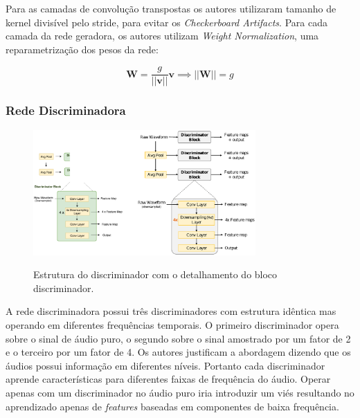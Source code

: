 \documentclass{article}
\begin{document}
Para as camadas de convolução transpostas os autores utilizaram tamanho de kernel divisível pelo stride, para evitar os \textit{Checkerboard Artifacts}\cite{checkerboard-artifacts}. Para cada camada da rede geradora, os autores utilizam \textit{Weight Normalization}\cite{weightnorm}, uma reparametrização dos pesos da rede:

\begin{equation}
\textbf{W} = \frac{g}{||\textbf{v}||}\textbf{v} \implies ||\textbf{W}|| = g
\end{equation}

\subsubsection{Rede Discriminadora}

\begin{figure}[H]
	\begin{minipage}[b]{1.0\linewidth}
		\centering
		\hspace*{-4.3cm}
		{\includegraphics[width=8.5cm]{Figures/dis.eps}}
	\end{minipage}
	\caption{Estrutura do discriminador com o detalhamento do bloco discriminador.}
	\label{fig:res}
\end{figure}

A rede discriminadora possui três discriminadores com estrutura idêntica mas operando em diferentes frequências temporais. O primeiro discriminador opera sobre o sinal de áudio puro, o segundo sobre o sinal amostrado por um fator de 2 e o terceiro por um fator de 4. Os autores justificam a abordagem dizendo que os áudios possui informação em diferentes níveis. Portanto cada discriminador aprende características para diferentes faixas de frequência do áudio. Operar apenas com um discriminador no áudio puro iria introduzir um viés resultando no aprendizado apenas de \textit{features} baseadas em componentes de baixa frequência.
\end{document}
